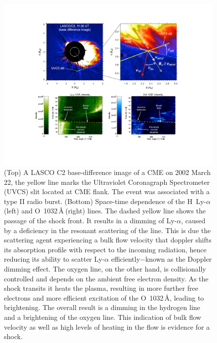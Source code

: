 \begin{figure}[t!]
\begin{center}
\includegraphics[trim=4.5cm 3cm 0cm 3cm, scale=0.75]{images/mancuso_uvcs.pdf}
\caption[CME flank shock observed by the UVCS spectrometer]{(Top) A LASCO C2 base-difference image of a CME on 2002 March 22, the yellow line marks the Ultraviolet Coronagraph Spectrometer (UVCS) slit located at CME flank. The event was associated with a type II radio burst. (Bottom) Space-time dependence of the H\, Ly-$\alpha$ (left) and O\, 1032\,\AA$~$(right) lines. The dashed yellow line shows the passage of the shock front. It results in a dimming of Ly-$\alpha$, caused by a deficiency in the resonant scattering of the line. This is due the scattering agent experiencing a bulk flow velocity that doppler shifts its absorption profile with respect to the incoming radiation, hence reducing its ability to scatter Ly-$\alpha$ efficiently$-$known as the Doppler dimming effect. The oxygen line, on the other hand, is collisionally controlled and depends on the ambient free electron density. As the shock transits it heats the plasma, resulting in more further free electrons and more efficient excitation of the O\, 1032\,\AA, leading to brightening. The overall result is a dimming in the hydrogen line and a brightening of the oxygen line. This indication of bulk flow velocity as well as high levels of heating in the flow is evidence for a shock.}
\label{fig:mancuso_uv}
\end{center}
\end{figure}


